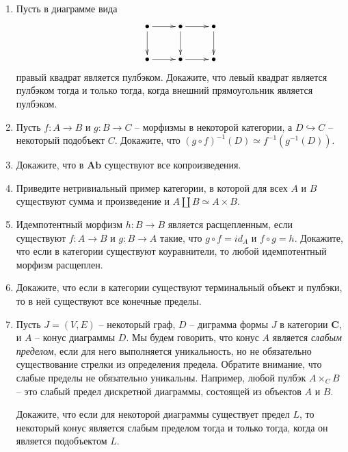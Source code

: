 \documentclass[draft]{article}
\newcommand{\cat}[1]{\mathbf{#1}}
\renewcommand{\C}{\cat{C}}
\newcommand{\Ab}{\cat{Ab}}
\begin{document}
\begin{enumerate}
\item Пусть в диаграмме вида
\[ \xymatrix{ \bullet \ar[r] \ar[d] & \bullet \ar[r] \ar[d] & \bullet \ar[d] \\
              \bullet \ar[r]        & \bullet \ar[r]        & \bullet
            } \]
правый квадрат является пулбэком.
Докажите, что левый квадрат является пулбэком тогда и только тогда, когда внешний прямоугольник является пулбэком.

\item Пусть $f : A \to B$ и $g : B \to C$ -- морфизмы в некоторой категории, а $D \hookrightarrow C$ -- некоторый подобъект $C$.
Докажите, что $(g \circ f)^{-1}(D) \simeq f^{-1}(g^{-1}(D))$.

\item Докажите, что в $\Ab$ существуют все копроизведения.

\item Приведите нетривиальный пример категории, в которой для всех $A$ и $B$ существуют сумма и произведение и $A \amalg B \simeq A \times B$.

\item Идемпотентный морфизм $h : B \to B$ является расщепленным, если существуют $f : A \to B$ и $g : B \to A$ такие, что $g \circ f = id_A$ и $f \circ g = h$.
Докажите, что если в категории существуют коуравнители, то любой идемпотентный морфизм расщеплен.

\item Докажите, что если в категории существуют терминальный объект и пулбэки, то в ней существуют все конечные пределы.

\item Пусть $J = (V,E)$ -- некоторый граф, $D$ -- диграмма формы $J$ в категории $\C$, и $A$ -- конус диаграммы $D$.
Мы будем говорить, что конус $A$ является \emph{слабым пределом}, если для него выполняется уникальность, но не обязательно существование стрелки из определения предела.
Обратите внимание, что слабые пределы не обязательно уникальны.
Например, любой пулбэк $A \times_C B$ -- это слабый предел дискретной диаграммы, состоящей из объектов $A$ и $B$.

Докажите, что если для некоторой диаграммы существует предел $L$, то некоторый конус является слабым пределом тогда и только тогда, когда он является подобъектом $L$.

\end{enumerate}
\end{document}
